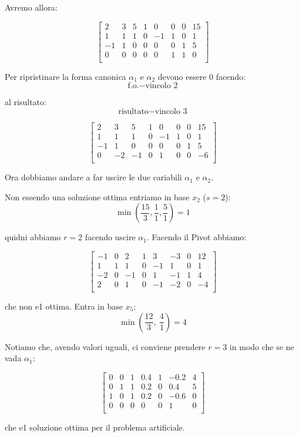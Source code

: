 Avremo allora:

$$
\left[ {\begin{array}{cccccccc}
	2 & 3 & 5 & 1 & 0 & 0 & 0 & 15\\
	1 & 1 & 1 & 0 & -1 & 1 & 0 & 1\\
	-1 & 1 & 0 & 0 & 0 & 0 & 1 & 5\\
	0 & 0 & 0 & 0 & 0 & 1 & 1 & 0\\
\end{array} } \right]
$$

Per ripristinare la forma canonica $\alpha_1$ e $\alpha_2$ devono essere $0$ facendo:
$$\text{f.o.} - \text{vincolo 2}$$

al risultato:
$$\text{risultato} - \text{vincolo 3}$$

$$
\left[ {\begin{array}{cccccccc}
	2 & 3 & 5 & 1 & 0 & 0 & 0 & 15\\
	1 & 1 & 1 & 0 & -1 & 1 & 0 & 1\\
	-1 & 1 & 0 & 0 & 0 & 0 & 1 & 5\\
	0 & -2 & -1 & 0 & 1 & 0 & 0 & -6\\
\end{array} } \right]
$$

Ora dobbiamo andare a far uscire le due cariabili $\alpha_1$ e $\alpha_2$.

Non essendo una soluzione ottima entriamo in base $x_2$ ($s = 2$):
$$\min (\frac{15}{3}, \frac{1}{1}, \frac{5}{1}) = 1$$

quidni abbiamo $r = 2$ facendo uscire $\alpha_1$. Facendo il Pivot abbiamo:

$$
\left[ {\begin{array}{cccccccc}
	-1 & 0 & 2 & 1 & 3 & -3 & 0 & 12\\
	1 & 1 & 1 & 0 & -1 & 1 & 0 & 1\\
	-2 & 0 & -1 & 0 & 1 & -1 & 1 & 4\\
	2 & 0 & 1 & 0 & -1 & -2 & 0 & -4\\
\end{array} } \right]
$$

che non e1 ottima. Entra in base $x_5$:
$$\min (\frac{12}{3},\ \frac{4}{1}) = 4$$

Notiamo che, avendo valori uguali, ci conviene prendere $r = 3$ in modo che se ne vada $\alpha_1$:

$$
\left[ {\begin{array}{ccccccc}
	0 & 0 & 1 & 0.4 & 1 & -0.2 & 4\\
	0 & 1 & 1 & 0.2 & 0 & 0.4 & 5\\
	1 & 0 & 1 & 0.2 & 0 & -0.6 & 0\\
	0 & 0 & 0 & 0 & 0 & 1 & 0\\
\end{array} } \right]
$$

che e1 soluzione ottima per il problema artificiale.